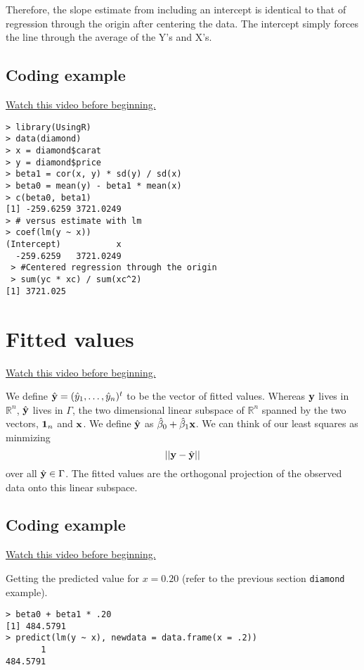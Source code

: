 Therefore, the slope estimate from including an intercept is identical to that of
regression through  the origin after centering the data. The intercept simply
forces the line through the average of the Y's and X's.

\subsection{Coding example}

\href{https://www.youtube.com/watch?v=fLITbjrkQks&list=PLpl-gQkQivXhdgUCdaUQcdb31CRe8Mm2y&index=15}{Watch this video before beginning.}

\begin{verbatim}
> library(UsingR)
> data(diamond)
> x = diamond$carat
> y = diamond$price
> beta1 = cor(x, y) * sd(y) / sd(x)
> beta0 = mean(y) - beta1 * mean(x)
> c(beta0, beta1)
[1] -259.6259 3721.0249
> # versus estimate with lm
> coef(lm(y ~ x))
(Intercept)           x 
  -259.6259   3721.0249 
 > #Centered regression through the origin
 > sum(yc * xc) / sum(xc^2)
[1] 3721.025
\end{verbatim}

\section{Fitted values}
\href{https://www.youtube.com/watch?v=QwYzfLOAQbo&index=16&list=PLpl-gQkQivXhdgUCdaUQcdb31CRe8Mm2y}{Watch this video before beginning.}

We define $\hat {\mathbf{y}} = (\hat y_1, \ldots, \hat y_n)^t$ to be the vector of fitted values.
Whereas $\mathbf{y}$ lives in $\mathbb{R}^n$, $\hat {\mathbf{y}}$ lives in $\Gamma$, the two dimensional
linear subspace of $\mathbb{R}^n$ spanned by the two vectors, $\mathbf{1}_n$ and $\mathbf{x}$. We
define $\hat {\mathbf{y}}$ as $\hat \beta_0 + \hat \beta_1 \mathbf{x}$. We can think of our
least squares as minmizing 
$$
|| \mathbf{y} - \hat {\mathbf{y}}|| 
$$
over all $\hat {\mathbf{y}} \in \Gamma$. The fitted values are the orthogonal projection
of the observed data onto this linear subspace.

\subsection{Coding example}
\href{https://www.youtube.com/watch?v=sFbhaImWA7c&index=17&list=PLpl-gQkQivXhdgUCdaUQcdb31CRe8Mm2y}{Watch this video before beginning.}

Getting the predicted value for $x=0.20$ (refer to the previous section \texttt{diamond} example). 
\begin{verbatim}
> beta0 + beta1 * .20
[1] 484.5791
> predict(lm(y ~ x), newdata = data.frame(x = .2))
       1 
484.5791 
\end{verbatim}

